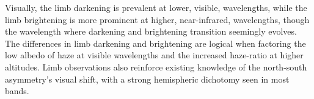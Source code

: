 \documentclass[tighten,linenumbers,twocolumn]{aastex631}
\def\um{\mathrm{\mu m}}
\begin{document}
Visually, the limb darkening is prevalent at lower, visible, wavelengths, while the limb brightening is more prominent at higher, near-infrared, wavelengths, though the wavelength where darkening and brightening transition seemingly evolves. The differences in limb darkening and brightening are logical when factoring the low albedo of haze at visible wavelengths and the increased haze-ratio at higher altitudes. Limb observations also reinforce existing knowledge of the north-south asymmetry's visual shift, with a strong hemispheric dichotomy seen in most bands.  


\end{document}
